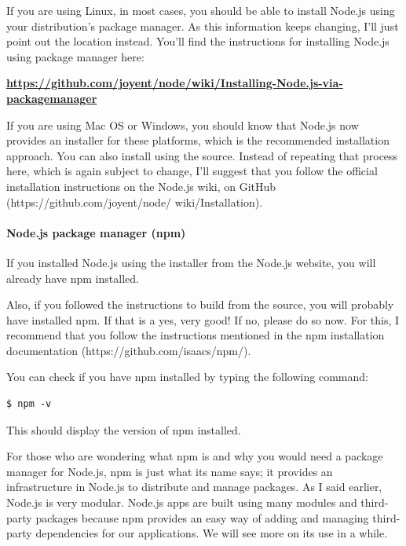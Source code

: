 If you are using Linux, in most cases, you should be able to install Node.js using
your distribution's package manager. As this information keeps changing, I'll just
point out the location instead. You'll find the instructions for installing Node.js using
package manager here:

\textbf{\href{https://github.com/joyent/node/wiki/Installing-Node.js-via-packagemanager}{https://github.com/joyent/node/wiki/Installing-Node.js-via-packagemanager}}


If you are using Mac OS or Windows, you should know that Node.js now provides
an installer for these platforms, which is the recommended installation approach.
You can also install using the source. Instead of repeating that process here, which
is again subject to change, I'll suggest that you follow the official installation
instructions on the Node.js wiki, on GitHub (https://github.com/joyent/node/
wiki/Installation).

\paragraph*{Node.js package manager (npm)}
\hfill \break
If you installed Node.js using the installer from the Node.js website, you will already
have npm installed.

Also, if you followed the instructions to build from the source, you will probably
have installed npm. If that is a yes, very good! If no, please do so now. For this,
I recommend that you follow the instructions mentioned in the npm installation
documentation (https://github.com/isaacs/npm/).\cite{16}

You can check if you have npm installed by typing the following command:

\begin{lstlisting}
$ npm -v
\end{lstlisting}

This should display the version of npm installed.

For those who are wondering what npm is and why you would need a package
manager for Node.js, npm is just what its name says; it provides an infrastructure
in Node.js to distribute and manage packages. As I said earlier, Node.js is very
modular. Node.js apps are built using many modules and third-party packages
because npm provides an easy way of adding and managing third-party
dependencies for our applications. We will see more on its use in a while.\cite{16}

